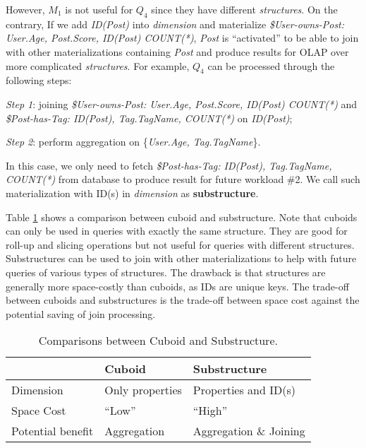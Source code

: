 However, $M_1$ is not useful for $Q_4$ since they have different \textit{structures}. On the contrary, If we add \textit{ID(Post)} into \textit{dimension} and materialize \textit{\$User-owns-Post: User.Age, Post.Score, ID(Post) COUNT(*)}, \textit{Post} is ``activated'' to be able to join with other materializations containing \textit{Post} and produce results for OLAP over more complicated \textit{structures}. For example, $Q_4$ can be processed through the following steps:


\noindent\emph{Step 1}: joining \textit{\$User-owns-Post: User.Age, Post.Score, ID(Post) COUNT(*)} and \textit{\$Post-has-Tag: ID(Post), Tag.TagName, COUNT(*)} on \emph{ID(Post)};

\noindent\emph{Step 2}: perform aggregation on \{\emph{User.Age, Tag.TagName}\}. 

In this case, we only need to fetch \textit{\$Post-has-Tag: ID(Post), Tag.TagName, COUNT(*)} from database to produce result for future workload \#2. We call such materialization with ID(s) in \textit{dimension} as \textbf{substructure}. 

Table \ref{Table:3:1} shows a comparison between cuboid and substructure. Note that cuboids can only be used in queries with exactly the same structure. They are good for roll-up and slicing operations but not useful for queries with different structures. Substructures can be used to join with other materializations to help with future queries of various types of structures. The drawback is that structures are generally more space-costly than cuboids, as IDs are unique keys. The trade-off between cuboids and substructures is the trade-off between space cost against the potential saving of join processing.


\begin{table}
	\footnotesize
	\begin {center}
	\begin{tabular}{ | l | l | l |}
		\hline
		&Cuboid&Substructure\\ \hline
		Dimension& Only properties& Properties and ID(s)\\ \hline
		Space Cost& ``Low''&``High''\\ \hline
		Potential benefit& Aggregation& Aggregation \& Joining\\ \hline
	\end{tabular}
	\end {center}
	\caption{Comparisons between Cuboid and Substructure.}
	\label{Table:3:1}
\end{table}


